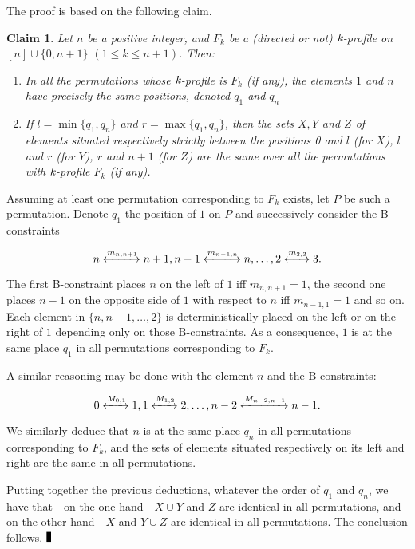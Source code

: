 \documentclass{article}
\newcommand{\kM}{\mbox{\it k}}
\newcommand{\n}{[n]}
\newcommand{\lrf}[1]{\xleftrightarrow{#1}}
\newtheorem{fait}{Claim}
\renewcommand{\Box}{\rule{1.5mm}{3mm}}
\begin{document}
The proof is based on the following claim. 
\begin{fait}
Let $n$ be a positive integer, and $F_k$ be a (directed or not) $\kM$-profile on $\n\cup\{0,n+1\}$ $(1\leq k\leq n+1)$. Then: 

\begin{enumerate}
\item In all the permutations whose $\kM$-profile is $F_k$ (if any),
the elements $1$ and $n$ have precisely the same positions, denoted $q_1$ and $q_n$
\item If $l=\min\{q_1,q_n\}$ and $r=\max\{q_1,q_n\}$, then the sets $X, Y$ and $Z$ of elements 
situated  respectively strictly between the positions 0 and $l$ (for $X$), $l$ and $r$ (for $Y$), 
$r$ and $n+1$ (for $Z$) are the same over all the permutations with $\kM$-profile $F_k$ (if any).
\end{enumerate} 
\label{claim:1n}
\end{fait} 

 Assuming at least one permutation corresponding to $F_k$ exists, let $P$ be such
a permutation. Denote $q_1$ the position of $1$ on $P$ and successively consider the B-constraints

$$n\lrf{m_{n,n+1}}n+1, n-1\lrf{m_{n-1,n}}n, \ldots, 2\lrf{m_{2,3}}3.$$ 

\noindent The first B-constraint places
$n$ on the left of $1$ iff $m_{n,n+1}=1$, the second one places $n-1$ on the opposite side of $1$ with respect to
$n$ iff $m_{n-1,1}=1$ and so on. Each element in $\{n, n-1,\ldots, 2\}$ is deterministically placed on the
left or on the right of $1$ depending only on those B-constraints.  As a consequence, $1$ is at the same place 
$q_1$ in all permutations corresponding to $F_k$.

A similar reasoning may be done with the element $n$ and the B-constraints: 

$$0\lrf{M_{0,1}}1, 1\lrf{M_{1,2}}2, \ldots, n-2\lrf{M_{n-2,n-1}}n-1.$$ 

\noindent We similarly deduce that $n$ is at the same place $q_n$ in all permutations corresponding to $F_k$,
and the sets of elements situated respectively on its left and right are the same in all permutations.

Putting together the previous deductions, whatever the order of $q_1$ and $q_n$,
we have that - on the one hand - $X\cup Y$ and $Z$ are identical in all permutations, and
- on the other hand - $X$ and $Y\cup Z$ are identical in all permutations. The conclusion follows. $\Box$
\bigskip
\end{document}
